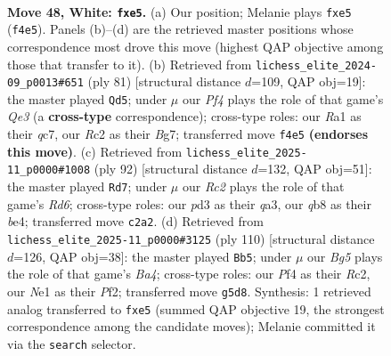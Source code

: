 \documentclass[11pt]{article}
\begin{document}
\clearpage

\begin{figure}[p]\centering
\begin{subfigure}{0.46\textwidth}\centering
\resizebox{\linewidth}{!}{%
\newchessgame
\chessboard[
  setfen={1q6/r4k1p/b3p2Q/p2pbpB1/P1n2P1P/3p4/2R5/RN2N1K1 w - - 0 48},
  showmover=false,
  pgfstyle=straightmove, color=movearrow, markmove={f4-e5}
]}
\caption{}
\end{subfigure}\hfill
\begin{subfigure}{0.46\textwidth}\centering
\resizebox{\linewidth}{!}{%
\newchessgame
\chessboard[
  setfen={6bk/2Q3b1/2pBq1pp/8/P1pPN1P1/2P2p1P/r4P2/4RK2 b - - 12 41},
  showmover=false,
  pgfstyle=straightmove, color=movearrow, markmove={e6-d5}
]}
\caption{}
\end{subfigure}
\\[4pt]
\begin{subfigure}{0.46\textwidth}\centering
\resizebox{\linewidth}{!}{%
\newchessgame
\chessboard[
  setfen={6rk/4b2p/p2R1p2/4pP2/2p1bpBQ/q6P/5B1K/8 w - - 4 47},
  showmover=false,
  pgfstyle=straightmove, color=movearrow, markmove={d6-d7}
]}
\caption{}
\end{subfigure}\hfill
\begin{subfigure}{0.46\textwidth}\centering
\resizebox{\linewidth}{!}{%
\newchessgame
\chessboard[
  setfen={2bk4/2b2q2/1p3r2/3p1Np1/B2Pp1Pp/PQ5P/2R2P2/4K3 w - - 8 56},
  showmover=false,
  pgfstyle=straightmove, color=movearrow, markmove={a4-b5}
]}
\caption{}
\end{subfigure}
\caption{\textbf{Move 48, White: \texttt{fxe5}.} (a) Our position; Melanie plays \texttt{fxe5} (\texttt{f4e5}). Panels (b)--(d) are the retrieved master positions whose correspondence most drove this move (highest QAP objective among those that transfer to it). (b) Retrieved from \texttt{lichess\_elite\_2024-09\_p0013\#651} (ply 81) [structural distance $d$=109, QAP obj=19]: the master played \texttt{Qd5}; under $\mu$ our \emph{Pf4} plays the role of that game's \emph{Qe3} (a \textbf{cross-type} correspondence); cross-type roles: our \emph{R}a1 as their \emph{q}c7, our \emph{R}c2 as their \emph{B}g7; transferred move \texttt{f4e5} \textbf{(endorses this move)}. (c) Retrieved from \texttt{lichess\_elite\_2025-11\_p0000\#1008} (ply 92) [structural distance $d$=132, QAP obj=51]: the master played \texttt{Rd7}; under $\mu$ our \emph{Rc2} plays the role of that game's \emph{Rd6}; cross-type roles: our \emph{p}d3 as their \emph{q}a3, our \emph{q}b8 as their \emph{b}e4; transferred move \texttt{c2a2}. (d) Retrieved from \texttt{lichess\_elite\_2025-11\_p0000\#3125} (ply 110) [structural distance $d$=126, QAP obj=38]: the master played \texttt{Bb5}; under $\mu$ our \emph{Bg5} plays the role of that game's \emph{Ba4}; cross-type roles: our \emph{P}f4 as their \emph{R}c2, our \emph{N}e1 as their \emph{P}f2; transferred move \texttt{g5d8}. Synthesis: 1 retrieved analog transferred to \texttt{fxe5} (summed QAP objective 19, the strongest correspondence among the candidate moves); Melanie committed it via the \texttt{search} selector.}
\label{fig:thought-m94}
\end{figure}
\end{document}

